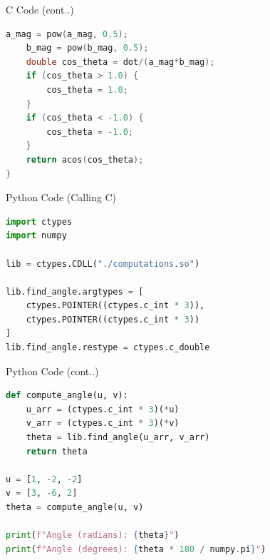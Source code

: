 \documentclass{beamer}
\begin{document}
\begin{frame}[fragile]{C Code (cont..)}
\begin{lstlisting}[language=C]
    a_mag = pow(a_mag, 0.5);
    b_mag = pow(b_mag, 0.5);
    double cos_theta = dot/(a_mag*b_mag);
    if (cos_theta > 1.0) {
        cos_theta = 1.0; 
    }
    if (cos_theta < -1.0) {
        cos_theta = -1.0;
    }
    return acos(cos_theta);
}
\end{lstlisting}
\end{frame}

\begin{frame}[fragile]{Python Code (Calling C)}
\begin{lstlisting}[language=Python]
import ctypes
import numpy

lib = ctypes.CDLL("./computations.so")

lib.find_angle.argtypes = [
    ctypes.POINTER((ctypes.c_int * 3)),
    ctypes.POINTER((ctypes.c_int * 3))
]
lib.find_angle.restype = ctypes.c_double
\end{lstlisting}
\end{frame}


\begin{frame}[fragile]{Python Code (cont..)}
\begin{lstlisting}[language=Python]
def compute_angle(u, v):
    u_arr = (ctypes.c_int * 3)(*u)
    v_arr = (ctypes.c_int * 3)(*v)
    theta = lib.find_angle(u_arr, v_arr)
    return theta

u = [1, -2, -2]
v = [3, -6, 2]
theta = compute_angle(u, v)

print(f"Angle (radians): {theta}")
print(f"Angle (degrees): {theta * 180 / numpy.pi}")
\end{lstlisting}
\end{frame}
\end{document}
